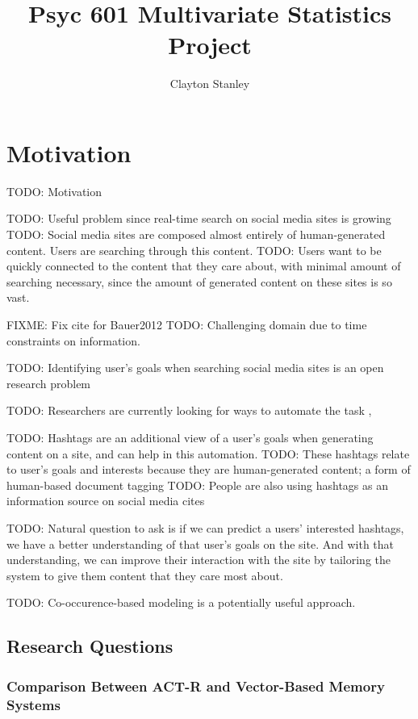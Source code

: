 \documentclass[man]{apa6}
\title{Psyc 601 Multivariate Statistics Project}
\author{Clayton Stanley}
\affiliation{Rice University}
\begin{document}
\maketitle

\tableofcontents
\newpage

\section{Motivation}

TODO: Motivation

TODO: Useful problem since real-time search on social media sites is growing \cite{Jansen2011}
TODO: Social media sites are composed almost entirely of human-generated content.
Users are searching through this content.
TODO: Users want to be quickly connected to the content that they care about, with minimal amount of searching necessary, since the amount of generated content on these sites is so vast.

FIXME: Fix cite for Bauer2012
TODO: Challenging domain due to time constraints on information. \cite{Bauer2012}

TODO: Identifying user's goals when searching social media sites is an open research problem \cite{Rose2004}

TODO: Researchers are currently looking for ways to automate the task \cite{Lee2005}, \cite{Jansen2008}

TODO: Hashtags are an additional view of a user's goals when generating content on a site, and can help in this automation.
TODO: These hashtags relate to user's goals and interests because they are human-generated content; a form of human-based document tagging \cite{Chang2010}
TODO: People are also using hashtags as an information source on social media cites \cite{Diakopoulos2010} \cite{Kwak2010}

TODO: Natural question to ask is if we can predict a users' interested hashtags, we have a better understanding of that user's goals on the site.
And with that understanding, we can improve their interaction with the site by tailoring the system to give them content that they care most about.

TODO: Co-occurence-based modeling is a potentially useful approach. \cite{Efron2010}

\subsection{Research Questions}

\subsubsection{Comparison Between ACT-R and Vector-Based Memory Systems}
\end{document}

